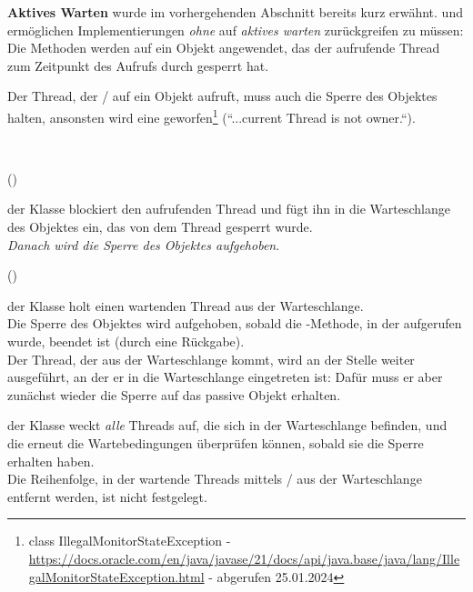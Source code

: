 \noindent
\textbf{Aktives Warten} wurde im vorhergehenden Abschnitt bereits kurz erwähnt.
 und  ermöglichen Implementierungen \textit{ohne} auf \textit{aktives warten} zurückgreifen zu müssen: Die Methoden werden auf ein Objekt angewendet, das der aufrufende Thread zum Zeitpunkt des Aufrufs durch  gesperrt hat.

\begin{tcolorbox}[enlarge top by=0.5cm,enlarge bottom by=0.5cm]
    Der Thread, der  /  auf ein Objekt aufruft, muss auch die Sperre des Objektes halten, ansonsten wird eine  geworfen\footnote{
    class IllegalMonitorStateException - \url{https://docs.oracle.com/en/java/javase/21/docs/api/java.base/java/lang/IllegalMonitorStateException.html} - abgerufen 25.01.2024
    } (``...current Thread is not owner.``).
\end{tcolorbox}\\

\begin{center}
 ()
\end{center}
\noindent
der Klasse  blockiert den aufrufenden Thread und fügt ihn in die Warteschlange des Objektes ein, das von dem Thread gesperrt wurde.\\
\textit{Danach wird die Sperre des Objektes aufgehoben}.

\begin{center}
     ()
\end{center}
\noindent
der Klasse  holt einen wartenden Thread aus der Warteschlange.\\
Die Sperre des Objektes wird aufgehoben, sobald die -Methode, in der  aufgerufen wurde, beendet ist (durch eine Rückgabe).\\
Der Thread, der aus der Warteschlange kommt, wird an der Stelle weiter ausgeführt, an der er in die Warteschlange eingetreten ist: Dafür muss er aber zunächst wieder die Sperre auf das passive Objekt erhalten.

\begin{center}
\end{center}
\noindent
der Klasse  weckt \textit{alle} Threads auf, die sich in der Warteschlange befinden, und die erneut die Wartebedingungen überprüfen können, sobald sie die Sperre erhalten haben.\\
Die Reihenfolge, in der wartende Threads mittels / aus der Warteschlange entfernt werden, ist nicht festgelegt.


